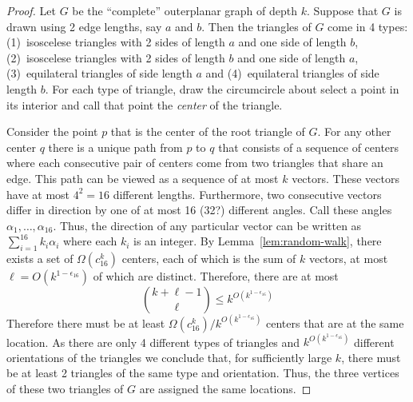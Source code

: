 \documentclass{article}
\begin{document}
\begin{proof}
Let $G$ be the ``complete'' outerplanar graph of depth $k$.  Suppose
that $G$ is drawn using 2 edge lengths, say $a$ and $b$.  Then the
triangles of $G$ come in 4 types: (1)~isoscelese triangles with 2
sides of length $a$ and one side of length $b$, (2)~isoscelese
triangles with 2 sides of length $b$ and one side of length $a$,
(3)~equilateral triangles of side length $a$ and (4)~equilateral
triangles of side length $b$.  For each type of triangle, draw the
circumcircle about select a
point in its interior and call that point the \emph{center} of the
triangle.

Consider the point $p$ that is the center of the root triangle of $G$.
For any other center $q$ there is a unique path from $p$ to $q$ that
consists of a sequence of centers where each consecutive pair of
centers come from two triangles that share an edge.  This path can be
viewed as a sequence of at most $k$ vectors.  These vectors have at
most $4^2=16$ different lengths.  Furthermore, two consecutive vectors
differ in direction by one of at most 16 (32?) different angles.  Call
these angles $\alpha_1,\ldots,\alpha_{16}$.  Thus, the direction of
any particular vector can be written as $\sum_{i=1}^{16} k_i\alpha_i$
where each $k_i$ is an integer.  By Lemma~\ref{lem:random-walk}, there
exists a set of $\Omega(c_{16}^k)$ centers, each of which is the sum
of $k$ vectors, at most $\ell=O(k^{1-\epsilon_{16}})$ of which are
distinct.  Therefore, there are at most
\[
     {k+\ell-1 \choose \ell} \le k^{O(k^{1-\epsilon_{16}})}    
\]
Therefore there must be at least
$\Omega(c_{16}^k)/k^{O(k^{1-\epsilon_{16}})}$ centers that are at the
same location.  As there are only 4 different types of triangles and
$k^{O(k^{1-\epsilon_{16}})}$ different orientations of the triangles we
conclude that, for sufficiently large $k$, there must be at least 2
triangles of the same type and orientation.  Thus, the three vertices
of these two triangles of $G$ are assigned the same locations.
\end{proof}
\end{document}
